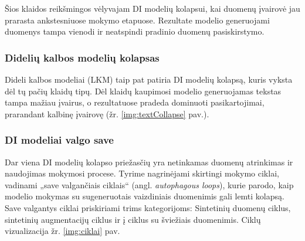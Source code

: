 \documentclass{VUMIFInfKursinis}
\begin{document}
Šios klaidos reikšmingos vėlyvajam DI modelių kolapsui, kai duomenų įvairovė jau prarasta ankstesniuose mokymo etapuose. Rezultate modelio generuojami duomenys tampa vienodi ir neatspindi pradinio duomenų pasiskirstymo.

\subsubsection{Didelių kalbos modelių kolapsas}

Dideli kalbos modeliai (LKM) taip pat patiria DI modelių kolapsą, kuris vyksta dėl tų pačių klaidų tipų. Dėl klaidų kaupimosi modelio generuojamas tekstas tampa mažiau įvairus, o rezultatuose pradeda dominuoti pasikartojimai, prarandant kalbinę įvairovę (žr. \ref{img:textCollapse} pav.).

\subsubsection{DI modeliai valgo save}
Dar viena DI modelių kolapso priežasčių yra netinkamas duomenų atrinkimas ir naudojimas mokymosi procese. Tyrime \cite{ModelsGoMAD} nagrinėjami skirtingi mokymo ciklai, vadinami „save valgančiais ciklais“ (angl. \textsl{autophagous loops}), kurie parodo, kaip modelio mokymas su sugeneruotais vaizdiniais duomenimis gali lemti kolapsą. Save valgantys ciklai priskiriami trims kategorijoms: Sintetinių duomenų ciklus, sintetinių augmentacijų ciklus ir į ciklus su šviežiais duomenimis. Ciklų vizualizacija žr. \ref{img:ciklai} pav.
\end{document}
